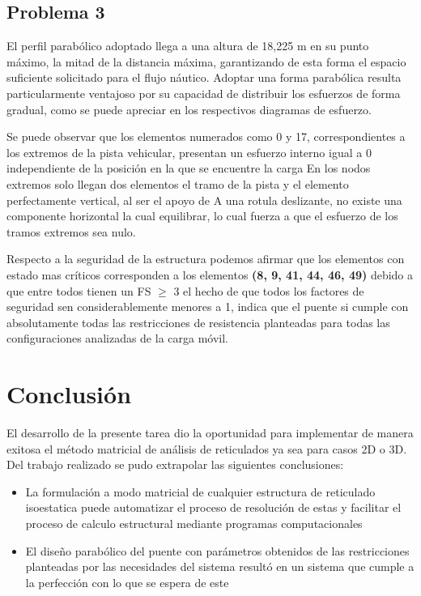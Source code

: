\documentclass[]{article}
\begin{document}
	\subsection{Problema 3}
	El perfil parabólico adoptado llega a una altura de 18,225 m en su punto máximo, la mitad de la distancia máxima, garantizando de esta forma el espacio suficiente solicitado para el flujo náutico. Adoptar una forma parabólica resulta particularmente ventajoso por su capacidad de distribuir los esfuerzos de forma gradual, como se puede apreciar en los respectivos diagramas de esfuerzo.
	
	Se puede observar que los elementos numerados como 0 y 17, correspondientes a los extremos de la pista vehicular, presentan un esfuerzo interno igual a 0 independiente de la posición en la que se encuentre la carga En los nodos extremos solo llegan dos elementos el tramo de la pista y el elemento perfectamente vertical, al ser el apoyo de A una rotula deslizante, no existe una componente horizontal la cual equilibrar, lo cual fuerza a que el esfuerzo de los tramos extremos sea nulo.
	
	Respecto a la seguridad de la estructura podemos afirmar que los elementos con estado mas críticos corresponden a los elementos \textbf{(8, 9, 41, 44, 46, 49)} debido a que entre todos tienen un FS $\geq$ 3
	el hecho de que todos los factores de seguridad sen considerablemente menores a 1, indica que el puente si cumple con absolutamente todas las restricciones de resistencia planteadas para todas las configuraciones analizadas de la carga móvil.
	\section{Conclusión}
	El desarrollo de la presente tarea dio la oportunidad para implementar de manera exitosa el método matricial de análisis de reticulados ya sea para casos 2D o 3D. Del trabajo realizado se pudo extrapolar las siguientes conclusiones:
	\begin{itemize}
		\item La formulación a modo matricial de cualquier estructura de reticulado isoestatica puede  automatizar el proceso de resolución de estas y facilitar el proceso de calculo estructural mediante programas computacionales
		\item El diseño parabólico del puente con parámetros obtenidos de las restricciones planteadas por las necesidades del sistema resultó en un sistema que cumple a la perfección con lo que se espera de este
	\end{itemize}
	
\end{document}
